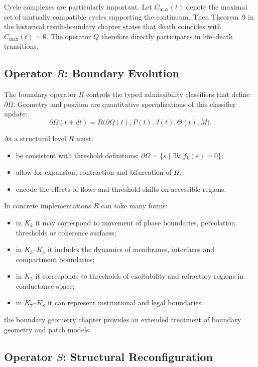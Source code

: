 Cycle complexes are particularly important. Let \(C_{\max}(t)\) denote the
maximal set of mutually compatible cycles supporting the continuum. Then
Theorem~9 in the historical result-boundary chapter states that death coincides with
\(C_{\max}(t) = \emptyset\). The operator \(Q\) therefore directly participates
in life–death transitions.

\subsection{Operator \texorpdfstring{\texorpdfstring{$R$}{R}}{R}: Boundary Evolution}

The boundary operator \(R\) controls the typed admissibility classifiers that
define \(\partial\Omega\). Geometry and position are quantitative
specializations of this classifier update:
\[
  \partial\Omega(t+dt) =
    R\big(\partial\Omega(t), P(t), J(t), \Theta(t), M\big).
\]

At a structural level \(R\) must:
\begin{itemize}
  \item be consistent with threshold definitions:
        \(\partial\Omega = \{ s \mid \exists k: f_k(s) = 0 \}\);
  \item allow for expansion, contraction and bifurcation of \(\Omega\);
  \item encode the effects of flows and threshold shifts on accessible regions.
\end{itemize}

In concrete implementations \(R\) can take many forms:
\begin{itemize}
  \item in \(K_2\) it may correspond to movement of phase boundaries,
        percolation thresholds or coherence surfaces;
  \item in \(K_3\)–\(K_4\) it includes the dynamics of membranes, interfaces
        and compartment boundaries;
  \item in \(K_5\) it corresponds to thresholds of excitability and refractory
        regions in conductance space;
  \item in \(K_7\)–\(K_8\) it can represent institutional and legal
        boundaries.
\end{itemize}

the boundary geometry chapter provides an extended treatment of boundary
geometry and patch models.

\subsection{Operator \texorpdfstring{\texorpdfstring{$S$}{S}}{S}: Structural Reconfiguration}

